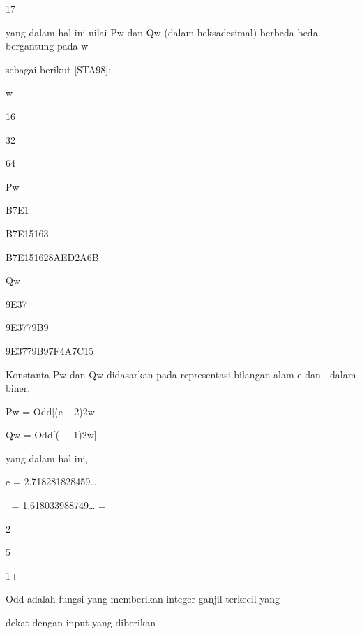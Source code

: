 \documentclass{article}
\begin{document}

17

yang dalam hal ini nilai Pw dan Qw (dalam heksadesimal) berbeda-beda bergantung pada w 

sebagai berikut [STA98]: 


w 

16 

32 

64 

Pw 

B7E1 

B7E15163 

B7E151628AED2A6B 

Qw 

9E37 

9E3779B9 

9E3779B97F4A7C15 



Konstanta Pw dan Qw didasarkan pada representasi bilangan alam e dan  dalam biner,  

Pw = Odd[(e – 2)2w]  

Qw = Odd[( – 1)2w]  


yang dalam hal ini, 

e = 2.718281828459…  

 = 1.618033988749… = 

2

5

1+



Odd adalah fungsi yang memberikan integer ganjil terkecil yang 

dekat dengan input yang diberikan
\end{document}
